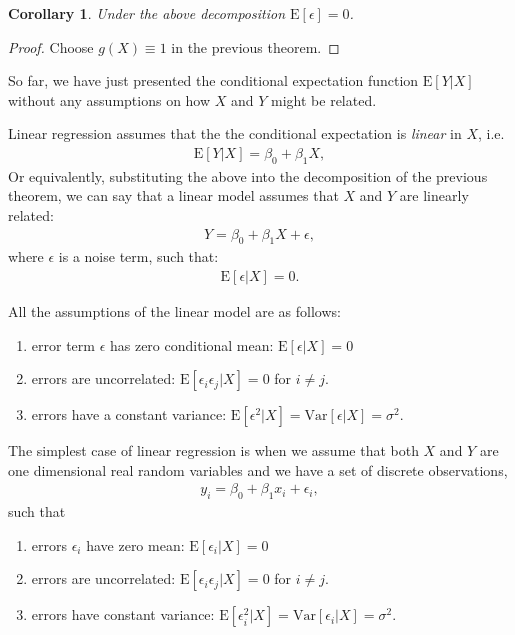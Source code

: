\documentclass{amsart}
\theoremstyle{plain}
\newtheorem{corollary}{Corollary}
\numberwithin{equation}{section}
\begin{document}
\begin{corollary} Under the above decomposition 
$\mathrm{E}[\epsilon] = 0$.
\end{corollary}
\begin{proof}
Choose $g(X) \equiv 1$ in the 
previous theorem. 
\end{proof}

So far, we have just presented the 
conditional expectation function $\mathrm{E}[Y|X]$
without any assumptions on how $X$ and $Y$ might
be related. 

Linear regression assumes that the
the conditional expectation is \emph{linear} in $X$, i.e.\
\begin{align*}
\mathrm{E}[Y|X] = \beta_0 + \beta_1 X,
\end{align*}
Or equivalently, substituting the above into the 
decomposition of the previous theorem, we can say that
a linear model assumes that 
$X$ and $Y$ are linearly related:
\begin{align*}
Y = \beta_0 + \beta_1 X + \epsilon,
\end{align*}
where $\epsilon$ is a noise term, such that:
\begin{align*}
\mathrm{E}[\epsilon|X] = 0.
\end{align*}

All the assumptions of the linear 
model are as follows:
\begin{enumerate}
\item error term $\epsilon$ has zero conditional mean: $\mathrm{E}[\epsilon|X] = 0$
\item errors are uncorrelated: 
$\mathrm{E}[\epsilon_i \epsilon_j |X] = 0$ for $i \neq j$.  
\item errors have a constant variance: $\mathrm{E}[\epsilon^2|X] = 
\mathrm{Var}[\epsilon|X] = \sigma^2$.
\end{enumerate} 

The simplest case of linear regression is when 
we assume that both $X$ and $Y$ are one dimensional
real random variables and we have a set of 
discrete observations,
\begin{align*}
y_i = \beta_0 + \beta_1 x_i + \epsilon_i,
\end{align*}
such that
\begin{enumerate}
\item errors $\epsilon_i$ have zero mean: $\mathrm{E}[\epsilon_i|X] = 0$
\item errors are uncorrelated: 
$\mathrm{E}[\epsilon_i \epsilon_j |X] = 0$ for $i \neq j$.  
\item errors have constant variance: $\mathrm{E}[\epsilon_i^2|X] = \mathrm{Var}[\epsilon_i|X] = \sigma^2$.
\end{enumerate} 
\end{document}
